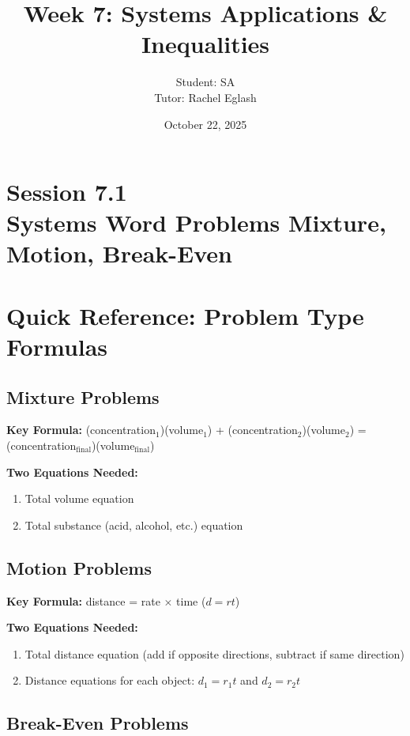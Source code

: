\documentclass[12pt]{article}
\title{Week 7: Systems Applications \& Inequalities}
\author{
	Student: SA\\
	Tutor: Rachel Eglash}
\date{October 22, 2025}
\begin{document}
	
	\maketitle

	\section*{Session 7.1 \\ Systems Word Problems Mixture, Motion, Break-Even}
	
	    \newpage
	
	\section*{Quick Reference: Problem Type Formulas}
	
	    \subsection*{Mixture Problems}
	
		    \textbf{Key Formula:}
			(concentration$_1$)(volume$_1$) + (concentration$_2$)(volume$_2$) = (concentration$_{\text{final}}$)(volume$_{\text{final}}$)
		
		    \textbf{Two Equations Needed:}
		    \begin{enumerate}
				\item Total volume equation
		    	\item Total substance (acid, alcohol, etc.) equation
		    \end{enumerate}
	
	    \subsection*{Motion Problems}
	
		    \textbf{Key Formula:}
			distance = rate $\times$ time \quad ($d = rt$)
		
		    \textbf{Two Equations Needed:}
			\begin{enumerate}
				\item Total distance equation (add if opposite directions, subtract if same direction)
				\item Distance equations for each object: $d_1 = r_1 t$ and $d_2 = r_2 t$
			\end{enumerate}
	
	    \subsection*{Break-Even Problems}
	
\end{document}
